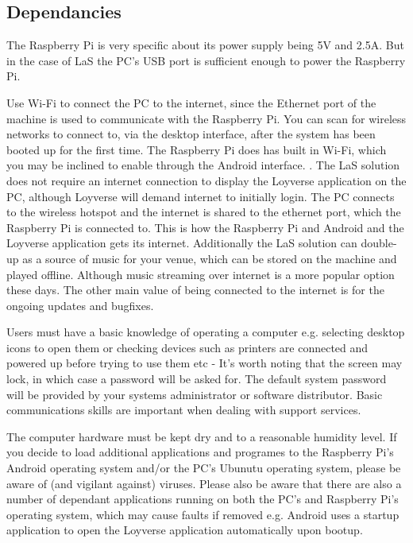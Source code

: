 \documentclass[letterpaper,10pt,openany,oneside,english]{sphinxmanual}
\begin{document}
\subsection{Dependancies}
\label{\detokenize{preperation:dependancies}}
 The Raspberry Pi is very specific about its power supply being 5V and 2.5A. But in the case of LaS the PC’s USB port is sufficient enough to power the Raspberry Pi.

 Use Wi-Fi to connect the PC to the internet, since the Ethernet port of the machine is used to communicate with the Raspberry Pi. You can scan for wireless networks to connect to, via the desktop interface, after the system has been booted up for the first time. The Raspberry Pi does has built in Wi-Fi, which you may be inclined to enable through the Android interface. . The LaS solution does not require an internet connection to display the Loyverse application on the PC, although Loyverse will demand internet to initially login. The PC connects to the wireless hotspot and the internet is shared to the ethernet port, which the Raspberry Pi is connected to. This is how the Raspberry Pi and Android and the Loyverse application gets its internet. Additionally the LaS solution can double-up as a source of music for your venue, which can be stored on the machine and played offline. Although music streaming over internet is a more popular option these days. The other main value of being connected to the internet is for the ongoing updates and bugfixes.

 Users must have a basic knowledge of operating a computer e.g. selecting desktop icons to open them or checking devices such as printers are connected and powered up before trying to use them etc - It’s worth noting that the screen may lock, in which case a password will be asked for. The default system password will be provided by your systems administrator or software distributor. Basic communications skills are important when dealing with support services.

 The computer hardware must be kept dry and to a reasonable humidity level. If you decide to load additional applications and programes to the Raspberry Pi’s Android operating system and/or the PC’s Ubunutu operating system, please be aware of (and vigilant against) viruses. Please also be aware that there are also a number of dependant applications running on both the PC’s and Raspberry Pi’s operating system, which may cause faults if removed e.g. Android uses a startup application to open the Loyverse application automatically upon bootup.
\end{document}
